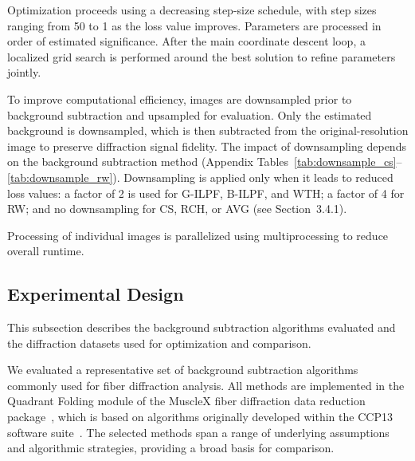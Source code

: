 \documentclass[iucr,review]{iucrjournals}
\begin{document}
Optimization proceeds using a decreasing step-size schedule, with step sizes ranging from 50 to 1 as the loss value improves. Parameters are processed in order of estimated significance. After the main coordinate descent loop, a localized grid search is performed around the best solution to refine parameters jointly.

To improve computational efficiency, images are downsampled prior to background subtraction and upsampled for evaluation. Only the estimated background is downsampled, which is then subtracted from the original-resolution image to preserve diffraction signal fidelity. The impact of downsampling depends on the background subtraction method (Appendix Tables~\ref{tab:downsample_cs}--\ref{tab:downsample_rw}). Downsampling is applied only when it leads to reduced loss values: a factor of 2 is used for G-ILPF, B-ILPF, and WTH; a factor of 4 for RW; and no downsampling for CS, RCH, or AVG (see Section~3.4.1).

Processing of individual images is parallelized using multiprocessing to reduce overall runtime.



\subsection{Experimental Design}

This subsection describes the background subtraction algorithms evaluated and the diffraction datasets used for optimization and comparison.


We evaluated a representative set of background subtraction algorithms commonly used for fiber diffraction analysis. All methods are implemented in the Quadrant Folding module of the MuscleX fiber diffraction data reduction package~\cite{JiratrakanvongEtAl2024}, which is based on algorithms originally developed within the CCP13 software suite~\cite{HeEtAl2007}. The selected methods span a range of underlying assumptions and algorithmic strategies, providing a broad basis for comparison.
\end{document}
